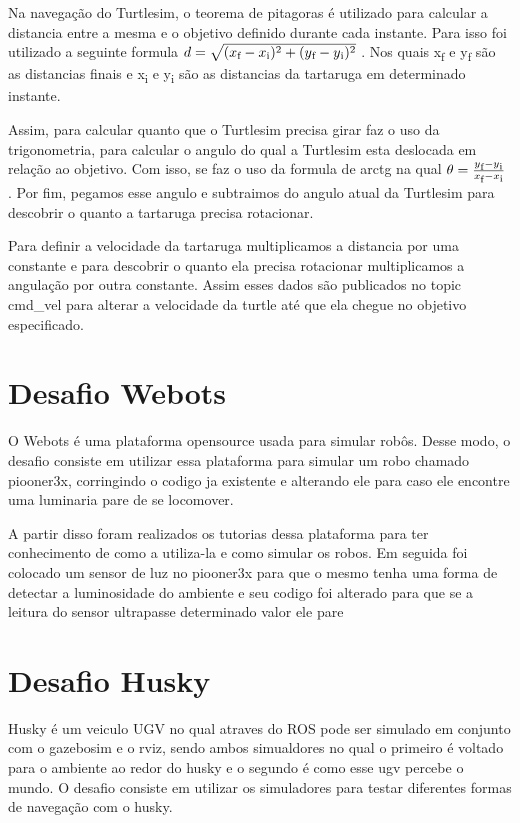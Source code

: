 {%

Na navegação do Turtlesim, o teorema de pitagoras é utilizado para calcular
a distancia entre a mesma e o objetivo definido durante cada instante. Para 
isso foi utilizado a seguinte formula 
$d = \sqrt{(x\textsubscript{f} - x\textsubscript{i})^2 + (y\textsubscript{f} - y\textsubscript{i})^2}$
. Nos quais x\textsubscript{f} e y\textsubscript{f} são as distancias finais
e x\textsubscript{i} e y\textsubscript{i} são as distancias da tartaruga 
em determinado instante.

Assim, para calcular quanto que o Turtlesim precisa girar faz o uso da 
trigonometria, para calcular o angulo do qual a Turtlesim esta deslocada 
em relação ao objetivo. Com isso, se faz o uso da formula de arctg na qual 
$\theta = \frac{y\textsubscript{f} - y\textsubscript{i}}{x\textsubscript{f} - x\textsubscript{i}} $
. Por fim, pegamos esse angulo e subtraimos do angulo atual da Turtlesim
para descobrir o quanto a tartaruga precisa rotacionar.

Para definir a velocidade da tartaruga multiplicamos a distancia por uma constante e
para descobrir o quanto ela precisa rotacionar multiplicamos a 
angulação por outra constante. Assim esses dados são publicados no topic
cmd\_vel para alterar a velocidade da turtle até que ela chegue no objetivo
especificado.

\section{Desafio Webots}

O Webots é uma plataforma opensource usada para simular robôs. 
Desse modo, o desafio consiste em utilizar essa plataforma para 
simular um robo chamado piooner3x, corringindo o codigo ja existente
e alterando ele para caso ele encontre uma luminaria pare de se locomover.

A partir disso foram realizados os tutorias dessa plataforma para 
ter conhecimento de como a utiliza-la e como simular os robos. 
Em seguida foi colocado um sensor de luz no piooner3x para que 
o mesmo tenha uma forma de detectar a luminosidade do ambiente
e seu codigo foi alterado para que se a leitura do sensor 
ultrapasse determinado valor ele pare


\section{Desafio Husky}
Husky é um veiculo UGV no qual atraves do ROS pode ser 
simulado em conjunto com o gazebosim e o rviz, sendo ambos
simualdores no qual o primeiro é voltado para o ambiente 
ao redor do husky e o segundo é como esse ugv percebe o mundo.
O desafio consiste em utilizar os simuladores para testar
diferentes formas de navegação com o husky.

}
